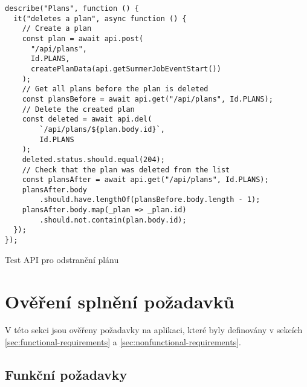 \begin{listing}[h]
\begin{verbatim}
describe("Plans", function () {
  it("deletes a plan", async function () {
    // Create a plan
    const plan = await api.post(
      "/api/plans",
      Id.PLANS,
      createPlanData(api.getSummerJobEventStart())
    );
    // Get all plans before the plan is deleted
    const plansBefore = await api.get("/api/plans", Id.PLANS);
    // Delete the created plan
    const deleted = await api.del(
        `/api/plans/${plan.body.id}`,
        Id.PLANS
    );
    deleted.status.should.equal(204);
    // Check that the plan was deleted from the list
    const plansAfter = await api.get("/api/plans", Id.PLANS);
    plansAfter.body
        .should.have.lengthOf(plansBefore.body.length - 1);
    plansAfter.body.map(_plan => _plan.id)
        .should.not.contain(plan.body.id);
  });
});
\end{verbatim}
\caption{Test API pro odstranění plánu}
\label{code:api-test}
\end{listing}

\section{Ověření splnění požadavků}

V této sekci jsou ověřeny požadavky na aplikaci, které byly definovány v sekcích \ref{sec:functional-requirements} a \ref{sec:nonfunctional-requirements}.


\subsection{Funkční požadavky}

